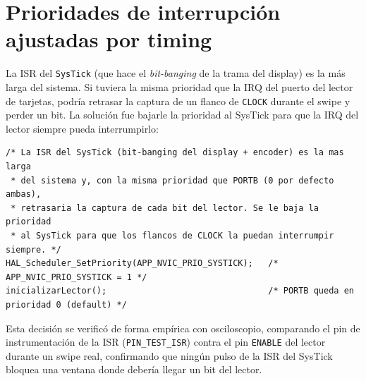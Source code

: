 \documentclass[11pt,a4paper]{article}
\begin{document}
\section{Prioridades de interrupción ajustadas por timing}

La ISR del \lstinline{SysTick} (que hace el \textit{bit-banging} de la
trama del display) es la más larga del sistema. Si tuviera la misma
prioridad que la IRQ del puerto del lector de tarjetas, podría retrasar la
captura de un flanco de \lstinline{CLOCK} durante el swipe y perder un
bit. La solución fue bajarle la prioridad al SysTick para que la IRQ del
lector siempre pueda interrumpirlo:

\begin{lstlisting}[caption={Ajuste de prioridad de interrupción documentado en \texttt{App\_Init()}.}, label={lst:priority}]
/* La ISR del SysTick (bit-banging del display + encoder) es la mas larga
 * del sistema y, con la misma prioridad que PORTB (0 por defecto ambas),
 * retrasaria la captura de cada bit del lector. Se le baja la prioridad
 * al SysTick para que los flancos de CLOCK la puedan interrumpir siempre. */
HAL_Scheduler_SetPriority(APP_NVIC_PRIO_SYSTICK);   /* APP_NVIC_PRIO_SYSTICK = 1 */
inicializarLector();                                /* PORTB queda en prioridad 0 (default) */
\end{lstlisting}

Esta decisión se verificó de forma empírica con osciloscopio, comparando
el pin de instrumentación de la ISR (\lstinline{PIN_TEST_ISR}) contra el
pin \lstinline{ENABLE} del lector durante un swipe real, confirmando que
ningún pulso de la ISR del SysTick bloquea una ventana donde debería
llegar un bit del lector.
\end{document}
